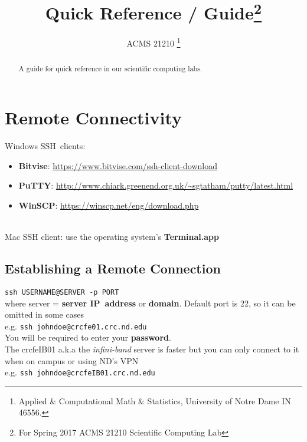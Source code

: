 
% 
\usepackage{hyperref}
\usepackage{xcolor}
\newcommand{\urlwofont}[1]{\urlstyle{same}\url{#1}}

\title{Quick Reference / Guide\thanks{For Spring 2017 ACMS 21210 Scientific Computing Lab}
      }
\author{ACMS 21210 \thanks{Applied \& Computational Math \& Statistics, University of Notre Dame IN 46556.}
       }




\maketitle

\begin{abstract}
A guide for quick reference in our scientific computing labs.\end{abstract}

\section{Remote Connectivity}


Windows SSH\ clients: \begin{itemize}
\item 
{\bf Bitvise}: \scriptsize\url{https://www.bitvise.com/ssh-client-download}
\item {\bf PuTTY}: \scriptsize\url{http://www.chiark.greenend.org.uk/\~sgtatham/putty/latest.html}
\item{\bf  WinSCP}: \scriptsize\url{https://winscp.net/eng/download.php}
\end{itemize}
\\
Mac SSH client: use the operating system's {\bf Terminal.app}

\subsection{Establishing a Remote Connection}

{\tt ssh USERNAME@SERVER -p PORT}
\\ where server = {\bf server IP\ address} or {\bf domain}. Default port is 22, so it can be omitted in some cases 
\\ e.g. {\tt ssh johndoe@crcfe01.crc.nd.edu}
\\ You will be required to enter your {\bf password}.
\\ The crcfeIB01 a.k.a the {\it infini-band} server is faster but you can only connect to it when on campus or using ND's VPN
\\ e.g. {\tt ssh johndoe@crcfeIB01.crc.nd.edu}

